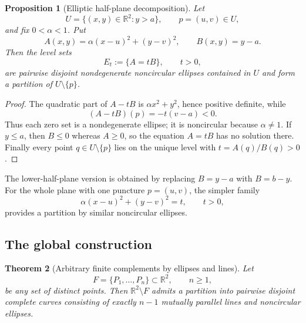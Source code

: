 \documentclass[11pt]{article}
\newtheorem{theorem}{Theorem}[section]
\newtheorem{proposition}[theorem]{Proposition}
\newcommand{\R}{\mathbb{R}}
\begin{document}
\begin{proposition}[Elliptic half-plane decomposition]\label{prop:elliptic-halfplane}
Let
\[
U=\{(x,y)\in\R^2:y>a\},
\qquad p=(u,v)\in U,
\]
and fix $0<\alpha<1$. Put
\[
A(x,y)=\alpha(x-u)^2+(y-v)^2,
\qquad B(x,y)=y-a.
\]
Then the level sets
\[
E_t:=\{A=tB\},\qquad t>0,
\]
are pairwise disjoint nondegenerate noncircular ellipses contained in $U$ and form a partition of $U\setminus\{p\}$.
\end{proposition}

\begin{proof}
The quadratic part of $A-tB$ is $\alpha x^2+y^2$, hence positive definite, while
\[
(A-tB)(p)=-t(v-a)<0.
\]
Thus each zero set is a nondegenerate ellipse; it is noncircular because $\alpha\ne1$. If $y\le a$, then $B\le0$ whereas $A\ge0$, so the equation $A=tB$ has no solution there. Finally every point $q\in U\setminus\{p\}$ lies on the unique level with $t=A(q)/B(q)>0$.
\end{proof}

The lower-half-plane version is obtained by replacing $B=y-a$ with $B=b-y$. For the whole plane with one puncture $p=(u,v)$, the simpler family
\[
\alpha(x-u)^2+(y-v)^2=t,\qquad t>0,
\]
provides a partition by similar noncircular ellipses.

\subsection{The global construction}

\begin{theorem}[Arbitrary finite complements by ellipses and lines]\label{thm:elliptic-global}
Let
\[
F=\{P_1,\dots,P_n\}\subset\R^2,
\qquad n\ge1,
\]
be any set of distinct points. Then $\R^2\setminus F$ admits a partition into pairwise disjoint complete curves consisting of exactly $n-1$ mutually parallel lines and noncircular ellipses.
\end{theorem}
\end{document}
